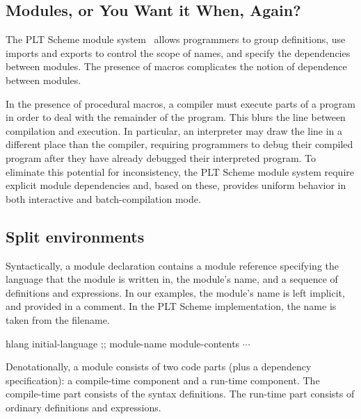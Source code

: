 \begin{schemeregion}
\section{Modules, or You Want it When, Again?}
\label{sect:modules}

The PLT Scheme module system~\cite{f:modules} allows programmers to
group definitions, use imports and exports to control the
scope of names, and specify the dependencies between modules. The
presence of macros complicates the notion of dependence between
modules.

In the presence of procedural macros, a compiler must execute parts of
a program in order to deal with the remainder of the program. This
blurs the line between compilation and execution.
%
In particular, an interpreter may draw the line in a different place
than the compiler, requiring programmers to debug their compiled
program after they have already debugged their interpreted program. To
eliminate this potential for inconsistency, the PLT Scheme module
system require explicit module dependencies and, based on these, 
provides uniform behavior in both interactive and
batch-compilation mode.


\subsection{Split environments}

Syntactically, a module declaration contains a
module reference specifying the language that the module is written
in, the module's name, and a sequence of definitions and expressions. 
In our examples, the module's name is left implicit, and provided in
a comment. In the PLT Scheme implementation, the name is taken from
the filename.
\begin{schemedisplay}
hlang initial-language ;; module-name
module-contents $\cdots$
\end{schemedisplay}
Denotationally, a module consists of two code parts (plus a dependency
specification): a compile-time
component and a run-time component. The compile-time part consists of
the syntax definitions. The run-time part consists of ordinary
definitions and expressions. 


\end{schemeregion}
